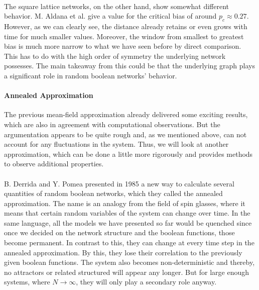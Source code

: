 \paragraph*{}
The square lattice networks, on the other hand, show somewhat different behavior. M. Aldana et al. \cite{aldana2003boolean2} give a value for the critical bias of around $p_c\approx 0.27$. However, as we can clearly see, the distance already retains or even grows with time for much smaller values. Moreover, the window from smallest to greatest bias is much more narrow to what we have seen before by direct comparison. This has to do with the high order of symmetry the underlying network possesses. The main takeaway from this could be that the underlying graph plays a significant role in random boolean networks' behavior.

\paragraph*{Annealed Approximation}\label{sec:annealed_approximation}
The previous mean-field approximation already delivered some exciting results, which are also in agreement with computational observations. But the argumentation appears to be quite rough and, as we mentioned above, can not account for any fluctuations in the system. Thus, we will look at another approximation, which can be done a little more rigorously and provides methods to observe additional properties.

\paragraph*{}
B. Derrida and Y. Pomea \cite{derrida1986random} presented in 1985 a new way to calculate several quantities of random boolean networks, which they called the annealed approximation. The name is an analogy from the field of spin glasses, where it means that certain random variables of the system can change over time. In the same language, all the models we have presented so far would be quenched since once we decided on the network structure and the boolean functions, those become permanent. In contrast to this, they can change at every time step in the annealed approximation. By this, they lose their correlation to the previously given boolean functions. The system also becomes non-deterministic and thereby, no attractors or related structured will appear any longer. But for large enough systems, where $N\longrightarrow\infty$, they will only play a secondary role anyway.

